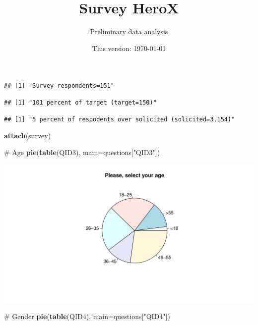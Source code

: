 \documentclass[12pt, titlepage]{article}
\institute{}
\title{Survey HeroX}
\author{Preliminary data analysis}
\date{This version: \today}
\newenvironment{Shaded}{\begin{snugshade}}{\end{snugshade}}
\newcommand{\KeywordTok}[1]{\textcolor[rgb]{0.12,0.11,0.11}{\textbf{#1}}}
\newcommand{\DataTypeTok}[1]{\textcolor[rgb]{0.00,0.34,0.68}{#1}}
\newcommand{\StringTok}[1]{\textcolor[rgb]{0.75,0.01,0.01}{#1}}
\newcommand{\CommentTok}[1]{\textcolor[rgb]{0.54,0.53,0.53}{#1}}
\newcommand{\NormalTok}[1]{\textcolor[rgb]{0.12,0.11,0.11}{#1}}
\begin{document}
\maketitle


\clearpage

\begin{verbatim}
## [1] "Survey respondents=151"
\end{verbatim}

\begin{verbatim}
## [1] "101 percent of target (target=150)"
\end{verbatim}

\begin{verbatim}
## [1] "5 percent of respodents over solicited (solicited=3,154)"
\end{verbatim}

\begin{Shaded}
\begin{Highlighting}[]
\KeywordTok{attach}\NormalTok{(survey)}

\CommentTok{# Age}
\KeywordTok{pie}\NormalTok{(}\KeywordTok{table}\NormalTok{(QID3), }\DataTypeTok{main=}\NormalTok{questions[}\StringTok{"QID3"}\NormalTok{])}
\end{Highlighting}
\end{Shaded}

\includegraphics{report_survey_files/figure-latex/unnamed-chunk-2-1.pdf}

\begin{Shaded}
\begin{Highlighting}[]
\CommentTok{# Gender}
\KeywordTok{pie}\NormalTok{(}\KeywordTok{table}\NormalTok{(QID4), }\DataTypeTok{main=}\NormalTok{questions[}\StringTok{"QID4"}\NormalTok{])}
\end{Highlighting}
\end{Shaded}
\end{document}
